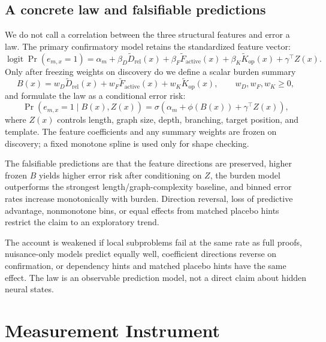 \documentclass[11pt,a4paper]{article}
\theoremstyle{plain}
\begin{document}
\subsection{A concrete law and falsifiable predictions}

We do not call a correlation between the three structural features and error a
law. The primary confirmatory model retains the standardized feature vector:
\begin{equation}
\operatorname{logit}\Pr(e_{m,x}=1)
=\alpha_m+\beta_D\widetilde D_{\mathrm{rel}}(x)
+\beta_F\widetilde F_{\mathrm{active}}(x)
+\beta_K\widetilde K_{\mathrm{op}}(x)
+\gamma^\top Z(x).
\end{equation}
Only after freezing weights on discovery do we define a scalar burden summary
\begin{equation}
B(x)=w_D\widetilde D_{\mathrm{rel}}(x)
+w_F\widetilde F_{\mathrm{active}}(x)
+w_K\widetilde K_{\mathrm{op}}(x),
\qquad w_D,w_F,w_K\geq 0,
\end{equation}
and formulate the law as a conditional error risk:
\begin{equation}
\Pr(e_{m,x}=1\mid B(x),Z(x))
=\sigma\left(\alpha_m+\phi(B(x))+\gamma^\top Z(x)\right),
\end{equation}
where $Z(x)$ controls length, graph size, depth, branching, target position,
and template. The feature coefficients and any summary weights are frozen on
discovery; a fixed monotone spline is used only for shape checking.

The falsifiable predictions are that the feature directions are preserved,
higher frozen $B$ yields higher error risk after conditioning on $Z$, the
burden model outperforms the strongest length/graph-complexity baseline, and
binned error rates increase monotonically with burden. Direction reversal,
loss of predictive advantage, nonmonotone bins, or equal effects from matched
placebo hints restrict the claim to an exploratory trend.

The account is weakened if local subproblems fail at the same rate as full
proofs, nuisance-only models predict equally well, coefficient directions
reverse on confirmation, or dependency hints and matched placebo hints have
the same effect. The law is an observable prediction model, not a direct claim
about hidden neural states.

\section{Measurement Instrument}
\end{document}
